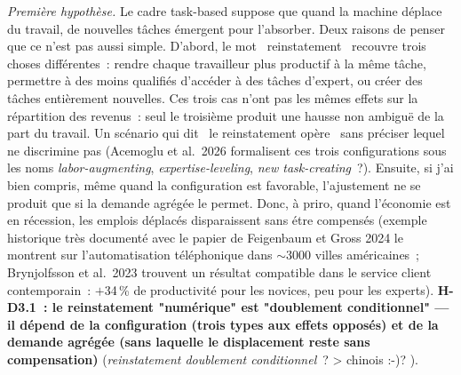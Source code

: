 \emph{Premi\`ere hypoth\`ese.} Le cadre task-based suppose que quand la machine d\'eplace du travail, de nouvelles t\^aches \'emergent pour l'absorber. Deux raisons de penser que ce n'est pas aussi simple. D'abord, le mot \og~reinstatement~\fg{} recouvre trois choses diff\'erentes~: rendre chaque travailleur plus productif \`a la m\^eme t\^ache, permettre \`a des moins qualifi\'es d'acc\'eder \`a des t\^aches d'expert, ou cr\'eer des t\^aches enti\`erement nouvelles. Ces trois cas n'ont pas les m\^emes effets sur la r\'epartition des revenus~: seul le troisi\`eme produit une hausse non ambigu\"e de la part du travail. Un sc\'enario qui dit \og~le reinstatement op\`ere~\fg{} sans pr\'eciser lequel ne discrimine pas (Acemoglu et al.\ 2026 formalisent ces trois configurations sous les noms \emph{labor-augmenting}, \emph{expertise-leveling}, \emph{new task-creating}~?). Ensuite, si j'ai bien compris, m\^eme quand la configuration est favorable, l'ajustement ne se produit que si la demande agr\'eg\'ee le permet. Donc, à priro, quand l'\'economie est en r\'ecession, les emplois d\'eplac\'es disparaissent sans \'etre compens\'es (exemple historique très documenté avec le papier de Feigenbaum et Gross 2024 le montrent sur l'automatisation t\'el\'ephonique dans $\sim$3000 villes am\'ericaines~; Brynjolfsson et al.\ 2023 trouvent un r\'esultat compatible dans le service client contemporain~: $+$34\,\% de productivit\'e pour les novices, peu pour les experts). \textbf{H-D3.1~: le reinstatement "numérique" est "doublement conditionnel" --- il d\'epend de la configuration (trois types aux effets oppos\'es) et de la demande agr\'eg\'ee (sans laquelle le displacement reste sans compensation)} (\emph{reinstatement doublement conditionnel}~? > chinois :-)? ).

